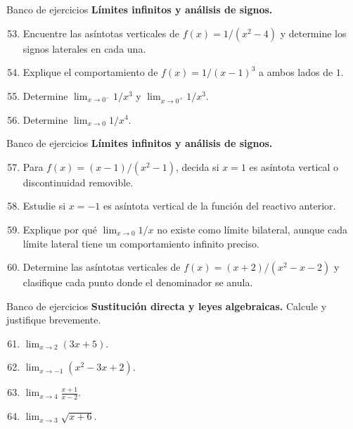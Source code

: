 \documentclass[12pt,aspectratio=169]{beamer}
\begin{document}
\begin{frame}[t,allowframebreaks]{Banco de ejercicios}
\small
\noindent \textbf{Límites infinitos y análisis de signos.}\par\smallskip
\begin{enumerate}\setcounter{enumi}{52}
\item Encuentre las asíntotas verticales de $f(x)=1/(x^2-4)$ y determine los signos laterales en cada una.
\item Explique el comportamiento de $f(x)=1/(x-1)^3$ a ambos lados de $1$.
\item Determine $\lim_{x\to0^-}1/x^3$ y $\lim_{x\to0^+}1/x^3$.
\item Determine $\lim_{x\to0}1/x^4$.
\end{enumerate}
\end{frame}


\begin{frame}[t,allowframebreaks]{Banco de ejercicios}
\small
\noindent \textbf{Límites infinitos y análisis de signos.}\par\smallskip
\begin{enumerate}\setcounter{enumi}{56}
\item Para $f(x)=(x-1)/(x^2-1)$, decida si $x=1$ es asíntota vertical o discontinuidad removible.
\item Estudie si $x=-1$ es asíntota vertical de la función del reactivo anterior.
\item Explique por qué $\lim_{x\to0}1/x$ no existe como límite bilateral, aunque cada límite lateral tiene un comportamiento infinito preciso.
\item Determine las asíntotas verticales de $f(x)=(x+2)/(x^2-x-2)$ y clasifique cada punto donde el denominador se anula.
\end{enumerate}
\end{frame}


\begin{frame}[t,allowframebreaks]{Banco de ejercicios}
\small
\noindent \textbf{Sustitución directa y leyes algebraicas.} Calcule y justifique brevemente.\par\smallskip
\begin{enumerate}\setcounter{enumi}{60}
\item $\displaystyle\lim_{x\to2}(3x+5)$.
\item $\displaystyle\lim_{x\to-1}(x^2-3x+2)$.
\item $\displaystyle\lim_{x\to4}\frac{x+1}{x-2}$.
\item $\displaystyle\lim_{x\to3}\sqrt{x+6}$.
\end{enumerate}
\end{frame}
\end{document}
